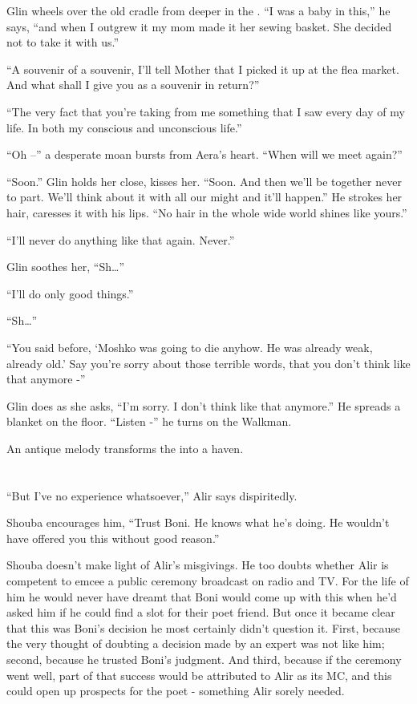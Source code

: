 \documentclass[twoside,11pt]{book}
\begin{document}
Glin wheels over the old cradle from deeper in the . ``I was a baby in this,'' he says,
``and when I outgrew it my mom made it her sewing basket. She decided not to take it with
us.''

``A souvenir of a souvenir, I'll tell Mother that I picked it up at the flea market. And what shall I give
you as a souvenir in return?''

``The very fact that you're taking from me something that I saw every day of my life. In both my conscious
and unconscious life.''

``Oh --'' a desperate moan bursts from Aera's heart. ``When will we meet
again?''

``Soon.'' Glin holds her close, kisses her. ``Soon. And then we'll be together
never to part. We'll think about it with all our might and it'll happen.'' He strokes her hair, caresses
it with his lips. ``No hair in the whole wide world shines like yours.''

``I'll never do anything like that again. Never.''

Glin soothes her, ``Sh{\dots}''

``I'll do only good things.''

``Sh\dots''

``You said before, `Moshko was going to die anyhow. He was already weak, already old.' Say you're sorry
about those terrible words, that you don't think like that anymore -''

Glin does as she asks, ``I'm sorry. I don't think like that anymore.'' He spreads a blanket on
the floor. ``Listen -'' he turns on the Walkman.

An antique melody transforms the into a haven.


\bigskip

\chapter{}

``But I've no experience whatsoever,'' Alir says dispiritedly.

Shouba encourages him, ``Trust Boni. He knows what he's doing. He wouldn't have offered you this without
good reason.''

Shouba doesn't make light of Alir's misgivings. He too doubts whether Alir is competent to emcee a public ceremony
broadcast on radio and TV. For the life of him he would never have dreamt that Boni would come up with this when he'd
asked him if he could find a slot for their poet friend. But once it became clear that this was Boni's decision he most
certainly didn't question it. First, because the very thought of doubting a decision made by an expert was not like
him; second, because he trusted Boni's judgment. And third, because if the ceremony went well, part of that success
would be attributed to Alir as its MC, and this could open up prospects for the poet - something Alir sorely needed.
\end{document}
